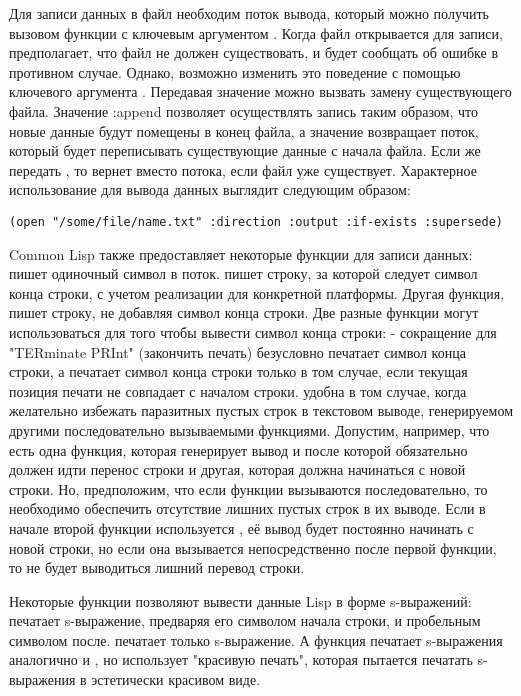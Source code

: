Для записи данных в файл необходим поток вывода, который можно получить вызовом функции
 с ключевым аргументом  . Когда файл открывается
для записи,  предполагает, что файл не должен существовать, и будет сообщать об
ошибке в противном случае. Однако, возможно изменить это поведение с помощью ключевого
аргумента . Передавая значение  можно вызвать замену
существующего файла. Значение :append позволяет осуществлять запись таким образом, что
новые данные будут помещены в конец файла, а значение  возвращает поток,
который будет переписывать существующие данные с начала файла. Если же передать
, то  вернет  вместо потока, если файл уже
существует. Характерное использование  для вывода данных выглядит следующим
образом:

\begin{lstlisting}
(open "/some/file/name.txt" :direction :output :if-exists :supersede)
\end{lstlisting}

Common Lisp также предоставляет некоторые функции для записи данных: 
пишет одиночный символ в поток.  пишет строку, за которой следует символ
конца строки, с учетом реализации для конкретной платформы. Другая функция,
 пишет строку, не добавляя символ конца строки. Две разные функции
могут использоваться для того чтобы вывести символ конца строки:  -
сокращение для "TERminate PRInt" (закончить печать) безусловно печатает символ конца
строки, а  печатает символ конца строки только в том случае, если текущая
позиция печати не совпадает с началом строки.  удобна в том случае, когда
желательно избежать паразитных пустых строк в текстовом выводе, генерируемом другими
последовательно вызываемыми функциями. Допустим, например, что есть одна функция, которая
генерирует вывод и после которой обязательно должен идти перенос строки и другая, которая
должна начинаться с новой строки. Но, предположим, что если функции вызываются
последовательно, то необходимо обеспечить отсутствие лишних пустых строк в их выводе. Если
в начале второй функции используется , её вывод будет постоянно начинать
с новой строки, но если она вызывается непосредственно после первой функции, то не будет
выводиться лишний перевод строки.

Некоторые функции позволяют вывести данные Lisp в форме s-выражений:  печатает
s-выражение, предваряя его символом начала строки, и пробельным символом
после.  печатает только s-выражение. А функция  печатает
s-выражения аналогично  и , но использует "красивую печать",
которая пытается печатать s-выражения в эстетически красивом виде.

